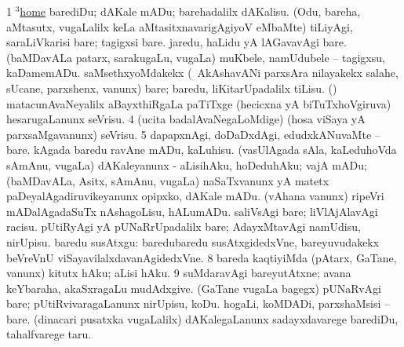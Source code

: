 \noindent
\gl{\pagu}
\expl{}
\bmng
\bnum
\num{1}  \hyperref{kandict_h.pdf}{H}{home(3) nuga(5)}{$^3$home}  
  
\banum
{} barediDu; dAKale mADu; barehadalilx dAKalisu. 
 (Odu, bareha, aMtasutx, \mo vugaLalilx keLa aMtasitxnavarigAgiyoV eMbaMte) tiLiyAgi, saraLiVkarisi bare; tagigxsi bare. 
 jaredu, haLidu yA lAGavavAgi bare. 
 (baMDavALa patarx, sarakugaLu, \mo vugaLa) muKbele, namUdubele -- tagigxsu, kaDamemADu. 
\eanum
\numie
{}  
\banum
{} saMsethxyoMdakekx (\kanmu\ AkAshavANi parxsAra nilayakekx salahe, sUcane, parxshenx, \mo vanunx) bare; baredu, liKitarUpadalilx tiLisu. 
 (\ame) matacunAvaNeyalilx aBayxthiRgaLa paTiTxge (hecicxna yA biTuTxhoVgiruva) hesarugaLanunx seVrisu. 
\eanum
\numie
\num{4}  (ucita badalAvaNegaLoMdige) (hosa viSaya yA parxsaMgavanunx) seVrisu. 
\num{5}  dapapxnAgi, doDaDxdAgi, edudxkANuvaMte -- bare. 
  
\banum
{} kAgada baredu ravAne mADu, kaLuhisu. 
 (vasUlAgada sAla, kaLeduhoVda sAmAnu, \mo vugaLa) dAKaleyanunx - aLisihAku, hoDeduhAku; vajA mADu; (baMDavALa, Asitx, sAmAnu, \mo vugaLa) naSaTxvanunx yA matetx paDeyalAgadiruvikeyanunx opipxko, dAKale mADu. 
 (vAhana \mo vanunx) ripeVri mADalAgadaSuTx nAshagoLisu, hALumADu. 
 saliVsAgi bare; liVlAjAlavAgi racisu. 
\eanum
\numie
{}  
\banum
{} pUtiRyAgi yA pUNaRrUpadalilx bare; AdayxMtavAgi namUdisu, nirUpisu. 
 baredu susAtxgu:  baredubaredu susAtxgidedxVne, bareyuvudakekx beVreVnU viSayavilalxdavanAgidedxVne. 
\eanum
\numie
\num{8}  bareda kaqtiyiMda (pAtarx, GaTane, \mo vanunx) kitutx hAku; aLisi hAku. 
\num{9}  suMdaravAgi bareyutAtxne; avana keYbaraha, akaSxragaLu mudAdxgive. 
  
\banum
{} (GaTane \mo vugaLa bagegx) pUNaRvAgi bare; pUtiRvivaragaLanunx nirUpisu, koDu. 
 hogaLi, koMDADi, parxshaMsisi -- bare. 
 (dinacari pusatxka \mo vugaLalilx) dAKalegaLanunx sadayxdavarege barediDu, tahalfvarege taru. 
\eanum
\numie
\enum
\emng
\eentry

\bentry
{} 
\gl{\nA}
\enum
\emng

